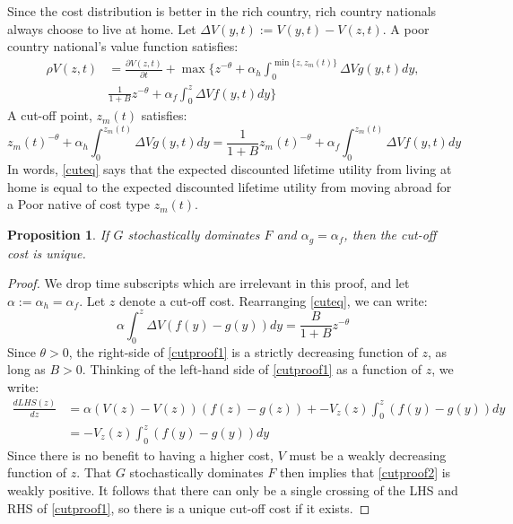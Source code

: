 \documentclass{article}
\newtheorem{proposition}[theorem]{Proposition}
\begin{document}
Since the cost distribution is better in the rich country, rich country nationals always choose to live at home.
Let $\Delta V(y,t) := V(y,t)-V(z,t)$.
A poor country national's value function satisfies:
\begin{align}
  \label{valfun}
  \rho V(z,t) &= \frac{\partial V(z,t)}{\partial t} + \max\Bigg\{z^{-\theta} +  \alpha_h \int_0^{\min \{z,z_m(t)\}} \Delta V g(y,t) dy, \nonumber  \\
  & \frac{1}{1+B} z^{-\theta}+ \alpha_f \int_0^z \Delta V f(y,t) dy \Bigg\}
\end{align}
A cut-off point, $z_m(t)$ satisfies:
\begin{equation}
  \label{cuteq}
  z_m(t)^{-\theta} + \alpha_h \int_0^{z_m(t)} \Delta V g(y,t) dy = \frac{1}{1+B} z_m(t)^{-\theta} + \alpha_f \int_0^{z_m(t)} \Delta V f(y,t)dy
\end{equation}
In words, \eqref{cuteq} says that the expected discounted lifetime utility from living at home is equal to the expected discounted lifetime utility from moving abroad for a Poor native of cost type $z_m(t)$.
\begin{proposition}
  \label{uniqcut}
 If $G$ stochastically dominates $F$ and $\alpha_g = \alpha_f$, then the cut-off cost is unique. 
\end{proposition}
\begin{proof}
  We drop time subscripts which are irrelevant in this proof, and let $\alpha := \alpha_h = \alpha_f$.
  Let $z$ denote a cut-off cost.
  Rearranging \eqref{cuteq}, we can write:
  \begin{equation}
    \label{cutproof1}
    \alpha \int_0^{z} \Delta V \left(f(y)-g(y)\right)dy = \frac{B}{1+B}z^{-\theta}
  \end{equation}
  Since $\theta > 0$, the right-side of \eqref{cutproof1} is a strictly decreasing function of $z$, as long as $B>0$.  
  Thinking of the left-hand side of \eqref{cutproof1} as a function of $z$, we write:
  \begin{align}
    \label{cutproof2}
    \frac{d LHS(z)}{d z} &= \alpha \left(V(z)-V(z)\right)\left(f(z)-g(z)\right) + -V_z(z) \int_0^z \left(f(y)-g(y)\right) dy \nonumber \\
    &= -V_z(z) \int_0^z \left(f(y)-g(y)\right) dy
  \end{align}
  Since there is no benefit to having a higher cost, $V$ must be a weakly decreasing function of $z$.  That $G$ stochastically dominates $F$ then implies that \eqref{cutproof2} is weakly positive.  It follows that there can only be a single crossing of the LHS and RHS of \eqref{cutproof1}, so there is a unique cut-off cost if it exists.
\end{proof}
\end{document}

